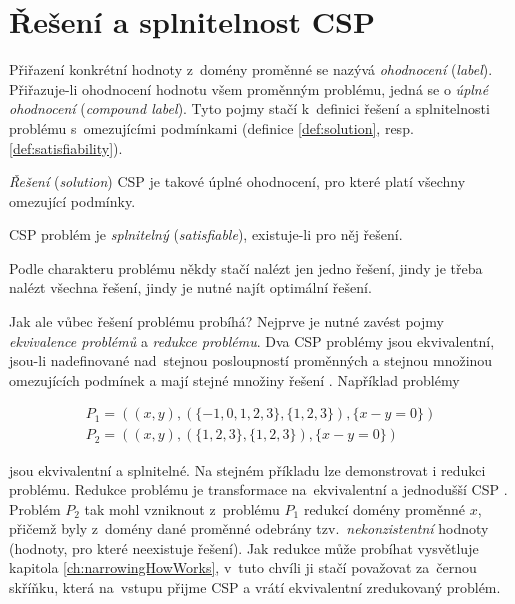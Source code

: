 \section{Řešení a splnitelnost CSP}
Přiřazení konkrétní hodnoty z~domény proměnné se nazývá \emph{ohodnocení} (\emph{label}). Přiřazuje-li ohodnocení hodnotu všem proměnným problému, jedná se o \emph{úplné ohodnocení} (\emph{compound label}). Tyto pojmy stačí k~definici řešení a splnitelnosti problému s~omezujícími podmínkami (definice \ref{def:solution}, resp. \ref{def:satisfiability}).

\begin{definition}
\label{def:solution}
\emph{Řešení} (\emph{solution}) CSP je takové úplné ohodnocení, pro které platí všechny omezující podmínky.
\end{definition}

\begin{definition}
\label{def:satisfiability}
CSP problém je \emph{splnitelný} (\emph{satisfiable}), existuje-li pro něj řešení.
\end{definition}

Podle charakteru problému někdy stačí nalézt jen jedno řešení, jindy je třeba nalézt všechna řešení, jindy je nutné najít optimální řešení.

Jak ale vůbec řešení problému probíhá? Nejprve je nutné zavést pojmy \emph{ekvivalence problémů} a \emph{redukce problému}. Dva CSP problémy jsou ekvivalentní, jsou-li nadefinované nad~stejnou posloupností proměnných a stejnou množinou omezujících podmínek a mají stejné množiny řešení \cite[s.~18]{Vu2005}. Například problémy

\begin{align*}
P_1 = ((x, y), (\{-1,0,1,2,3\}, \{1,2,3\}), \{x - y = 0\}) \\
P_2 = ((x, y), (\{1,2,3\}, \{1,2,3\}), \{x - y = 0\})
\end{align*}

jsou ekvivalentní a splnitelné. Na stejném příkladu lze demonstrovat i redukci problému. Redukce problému je transformace na~ekvivalentní a jednodušší CSP \cite[s.~23]{Vu2005}. Problém $P_2$ tak mohl vzniknout z~problému $P_1$ redukcí domény proměnné $x$, přičemž byly z~domény dané proměnné odebrány tzv.~\emph{nekonzistentní} hodnoty (hodnoty, pro které neexistuje řešení). Jak redukce může probíhat vysvětluje kapitola \ref{ch:narrowingHowWorks}, v~tuto chvíli ji stačí považovat za~černou skříňku, která na~vstupu přijme CSP a vrátí ekvivalentní zredukovaný problém.

